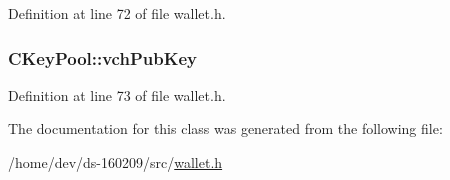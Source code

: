 Definition at line 72 of file wallet.\+h.

\hypertarget{class_c_key_pool_a937080a4cec1f2b138ebd200557c82b5}{}
\subsubsection[{vch\+Pub\+Key}]{ C\+Key\+Pool\+::vch\+Pub\+Key}\label{class_c_key_pool_a937080a4cec1f2b138ebd200557c82b5}


Definition at line 73 of file wallet.\+h.



The documentation for this class was generated from the following file\+:\begin{DoxyCompactItemize}
\item 
/home/dev/ds-\/160209/src/\hyperlink{wallet_8h}{wallet.\+h}\end{DoxyCompactItemize}
